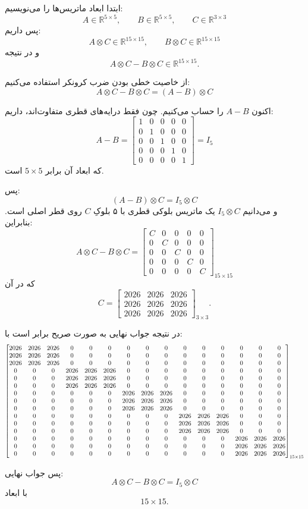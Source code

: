 
ابتدا ابعاد ماتریس‌ها را می‌نویسیم:
\[
A \in \mathbb{R}^{5\times 5}, \qquad
B \in \mathbb{R}^{5\times 5}, \qquad
C \in \mathbb{R}^{3\times 3}
\]
پس داریم:
\[
A\otimes C \in \mathbb{R}^{15\times 15}, \qquad
B\otimes C \in \mathbb{R}^{15\times 15}
\]
و در نتیجه
\[
A\otimes C - B\otimes C \in \mathbb{R}^{15\times 15}.
\]

از خاصیت خطی بودن ضرب کرونکر استفاده می‌کنیم:
\[
A\otimes C - B\otimes C = (A-B)\otimes C
\]

اکنون \(A-B\) را حساب می‌کنیم. چون فقط درایه‌های قطری متفاوت‌اند، داریم:
\[
A-B=
\begin{bmatrix}
1&0&0&0&0\\
0&1&0&0&0\\
0&0&1&0&0\\
0&0&0&1&0\\
0&0&0&0&1
\end{bmatrix}
= I_5
\]
که ابعاد آن برابر \(5\times 5\) است.

پس:
\[
(A-B)\otimes C = I_5 \otimes C
\]
و می‌دانیم \(I_5 \otimes C\) یک ماتریس بلوکی قطری با ۵ بلوکِ \(C\) روی قطر اصلی است. بنابراین:
\[
A\otimes C - B\otimes C
=
\begin{bmatrix}
C&0&0&0&0\\
0&C&0&0&0\\
0&0&C&0&0\\
0&0&0&C&0\\
0&0&0&0&C
\end{bmatrix}_{15\times 15}
\]
که در آن
\[
C=
\begin{bmatrix}
2026&2026&2026\\
2026&2026&2026\\
2026&2026&2026
\end{bmatrix}_{3\times 3}.
\]

در نتیجه جواب نهایی به صورت صریح برابر است با:
\[
\setcounter{MaxMatrixCols}{15}
\begin{bmatrix}
2026&2026&2026&0&0&0&0&0&0&0&0&0&0&0&0\\
2026&2026&2026&0&0&0&0&0&0&0&0&0&0&0&0\\
2026&2026&2026&0&0&0&0&0&0&0&0&0&0&0&0\\
0&0&0&2026&2026&2026&0&0&0&0&0&0&0&0&0\\
0&0&0&2026&2026&2026&0&0&0&0&0&0&0&0&0\\
0&0&0&2026&2026&2026&0&0&0&0&0&0&0&0&0\\
0&0&0&0&0&0&2026&2026&2026&0&0&0&0&0&0\\
0&0&0&0&0&0&2026&2026&2026&0&0&0&0&0&0\\
0&0&0&0&0&0&2026&2026&2026&0&0&0&0&0&0\\
0&0&0&0&0&0&0&0&0&2026&2026&2026&0&0&0\\
0&0&0&0&0&0&0&0&0&2026&2026&2026&0&0&0\\
0&0&0&0&0&0&0&0&0&2026&2026&2026&0&0&0\\
0&0&0&0&0&0&0&0&0&0&0&0&2026&2026&2026\\
0&0&0&0&0&0&0&0&0&0&0&0&2026&2026&2026\\
0&0&0&0&0&0&0&0&0&0&0&0&2026&2026&2026
\end{bmatrix}_{15\times 15}
\]

پس جواب نهایی:
\[
A\otimes C - B\otimes C = I_5\otimes C
\]
با ابعاد
\[
15\times 15.
\]
